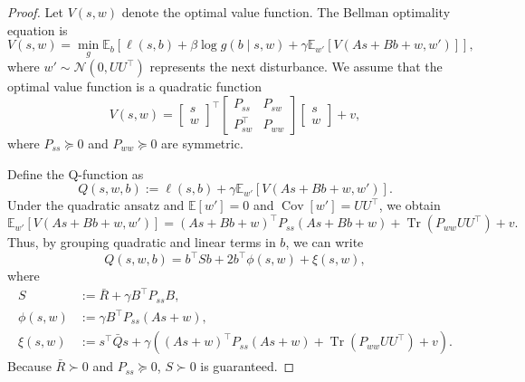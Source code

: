 \documentclass[letterpaper]{article} %
\DeclareMathOperator{\Tr}{Tr}     %
\DeclareMathOperator{\Cov}{Cov}   %
\providecommand{\E}{\mathbb{E}} %
\begin{document}
\begin{proof}
    Let $V(s, w)$ denote the optimal value function.
    The Bellman optimality equation is 
    \begin{equation}
    V(s, w) = \min_{g} \E_{b}\left[ \ell(s, b) + \beta \log g(b \mid s, w) + \gamma \E_{w'}\left[ V(As+Bb+w, w')\right]\right],
    \end{equation}
    where $w' \sim \mathcal{N}(0, UU^\top)$ represents the next disturbance.
    We assume that the optimal value function is a quadratic function
    \begin{equation}
    V(s, w) = \begin{bmatrix} s\\ w \end{bmatrix}^\top \begin{bmatrix} P_{ss} & P_{sw}\\ P_{sw}^\top & P_{ww} \end{bmatrix} \begin{bmatrix} s\\ w \end{bmatrix} + v ,
    \end{equation}
    where $P_{ss} \succcurlyeq 0$ and $P_{ww} \succcurlyeq 0$ are symmetric. 
    
    Define the Q-function as
    \begin{equation}
    Q(s, w, b) := \ell(s, b) + \gamma \E_{w'}[V(As + Bb + w, w')].
    \end{equation}
    Under the quadratic ansatz and $\E[w'] = 0$ and $\Cov[w'] = UU^\top$, we obtain
    \begin{equation}
    \E_{w'}[V(As + Bb + w, w')] = (A s + Bb + w)^\top P_{ss} (A s + Bb + w) + \Tr(P_{ww} UU^\top) + v .
    \end{equation}
    Thus, by grouping quadratic and linear terms in $b$, we can write
    \begin{equation}
    Q(s, w, b) = b^\top S b + 2 b^\top \phi(s, w) + \xi(s, w),
    \end{equation}
    where
    \begin{align}
    S &:= \bar{R} + \gamma B^\top P_{ss} B,\\
    \phi(s, w) &:= \gamma B^\top P_{ss} (A s + w),\\
    \xi(s, w) &:= s^\top \bar{Q} s + \gamma ((A s + w)^\top P_{ss} (A s + w) + \Tr(P_{ww} UU^\top) + v).
    \end{align}
    Because $\bar{R} \succ 0$ and $P_{ss} \succcurlyeq 0$, $S \succ 0$ is guaranteed.
    

\end{proof}
\end{document}
